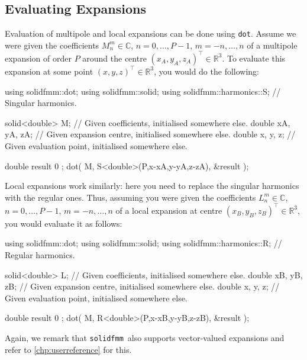 \documentclass{scrbook}
\newcommand{\solidfmm}{\texttt{solidfmm}}
\newcommand{\reals}{\ensuremath{\mathbb{R}}}
\newcommand{\complex}{\mathbb{C}}
\newcommand{\wholespace}{\ensuremath{\reals^3}}
\begin{document}
\subsection{Evaluating Expansions}
Evaluation of multipole and local expansions can be done using \lstinline|dot|.
Assume we were given the coefficients $M_n^m\in\complex$, $n=0,\dotsc,P-1$,
$m=-n,\dotsc,n$ of a multipole expansion of order $P$ around the centre
$(x_A,y_A,z_A)^\top\in\wholespace$. To evaluate this expansion at some
point $(x,y,z)^\top\in\wholespace$, you would do the following:
\begin{cppcode*}
using solidfmm::dot;
using solidfmm::solid;
using solidfmm::harmonics::S; // Singular harmonics.

solid<double> M;    // Given coefficients,     initialised somewhere else.
double xA, yA, zA;  // Given expansion centre, initialised somewhere else.
double x,  y,  z;   // Given evaluation point, initialised somewhere else.

double result { 0 };
dot( M, S<double>(P,x-xA,y-yA,z-zA), &result );
\end{cppcode*}

Local expansions work similarly: here you need to replace the singular
harmonics with the regular ones. Thus, assuming you were given the
coefficients $L_n^m\in\complex$, $n=0,\dotsc,P-1$, $m=-n,\dotsc,n$ of a
local expansion at centre $(x_B,y_B,z_B)^\top\in\wholespace$, you would
evaluate it as follows:
\begin{cppcode*}
using solidfmm::dot;
using solidfmm::solid;
using solidfmm::harmonics::R; // Regular harmonics.

solid<double> L;    // Given coefficients,     initialised somewhere else.
double xB, yB, zB;  // Given expansion centre, initialised somewhere else.
double x,  y,  z;   // Given evaluation point, initialised somewhere else.

double result { 0 };
dot( M, R<double>(P,x-xB,y-yB,z-zB), &result );
\end{cppcode*}

Again, we remark that \solidfmm\ also supports vector-valued expansions and
refer to \cref{chp:userreference} for this.
\end{document}
